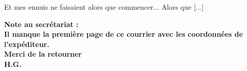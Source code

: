 \documentclass[11pt,twoside,a4paper]{article}
\begin{document}
\begin{minipage}[ht]{0.75\textwidth}
\begin{cursive}
Et mes ennuis ne faisaient alors que commencer... Alors que [...] ~\\
	\end{cursive}
\end{minipage} \hfill \begin{minipage}[ht]{0.20\textwidth}
	\footnotesize	\bfseries
		Note au secr{\'e}tariat :~\\ 
		Il manque la premi{\`e}re page de ce courrier avec les coordonn{\'e}es de l'exp{\'e}diteur. ~\\
		Merci de la retourner~\\
			H.G.~\\
\end{minipage}

\clearpage

\begin{multicols*}{2}

\end{multicols*}
\end{document}
